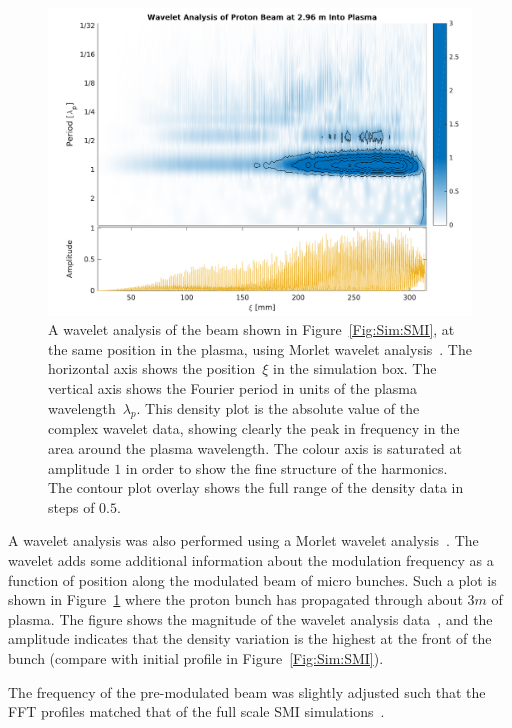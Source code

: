 \begin{figure}[hbt]
    \centering
    \includegraphics[width=1.0\linewidth]{figures/PBSMIWavelet}
    \caption{\label{Fig:SimA:Wavelet}
        A wavelet analysis of the beam shown in Figure~\ref{Fig:Sim:SMI}, at the same position in the plasma, using Morlet wavelet analysis~\cite{torrence:1998}.
        The horizontal axis shows the position~$\xi$ in the simulation box.
        The vertical axis shows the Fourier period in units of the plasma wavelength~$\lambda_p$.
        This density plot is the absolute value of the complex wavelet data, showing clearly the peak in frequency in the area around the plasma wavelength.
        The colour axis is saturated at amplitude $1$ in order to show the fine structure of the harmonics.
        The contour plot overlay shows the full range of the density data in steps of $0.5$.
    }
\end{figure}

A wavelet analysis was also performed using a Morlet wavelet analysis~\cite{goupillaud:1984,bernardino:2005}.
The wavelet adds some additional information about the modulation frequency as a function of position along the modulated beam of micro bunches.
Such a plot is shown in Figure~\ref{Fig:SimA:Wavelet} where the proton bunch has propagated through about $3\unit{m}$ of plasma.
The figure shows the magnitude of the wavelet analysis data~\cite{lee:1994}, and the amplitude indicates that the density variation is the highest at the front of the bunch (compare with initial profile in Figure~\ref{Fig:Sim:SMI}).

The frequency of the pre-modulated beam was slightly adjusted such that the FFT profiles matched that of the full scale SMI simulations~\cite{berglyd_olsen:2015}.

